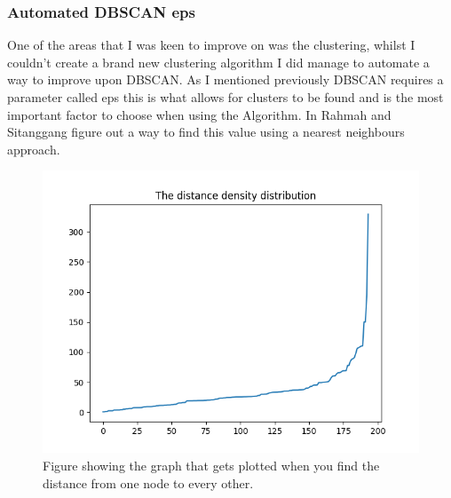 \subsubsection{Automated DBSCAN eps}

One of the areas that I was keen to improve on was the clustering, whilst I couldn't create a brand new clustering algorithm I did manage to automate a way to improve upon DBSCAN. As I mentioned previously DBSCAN requires a parameter called eps this is what allows for clusters to be found and is the most important factor to choose when using the Algorithm. In \cite{optimal_eps_value_DBSCAN} Rahmah and Sitanggang figure out a way to find this value using a nearest neighbours approach.

\begin{figure}[h]
    \centering
    \includegraphics[width=\textwidth]{figures/eps_finder_graph_whole.png}
    \caption{Figure showing the graph that gets plotted when you find the distance from one node to every other.}
    \label{fig:whole_eps_graph}
\end{figure}

